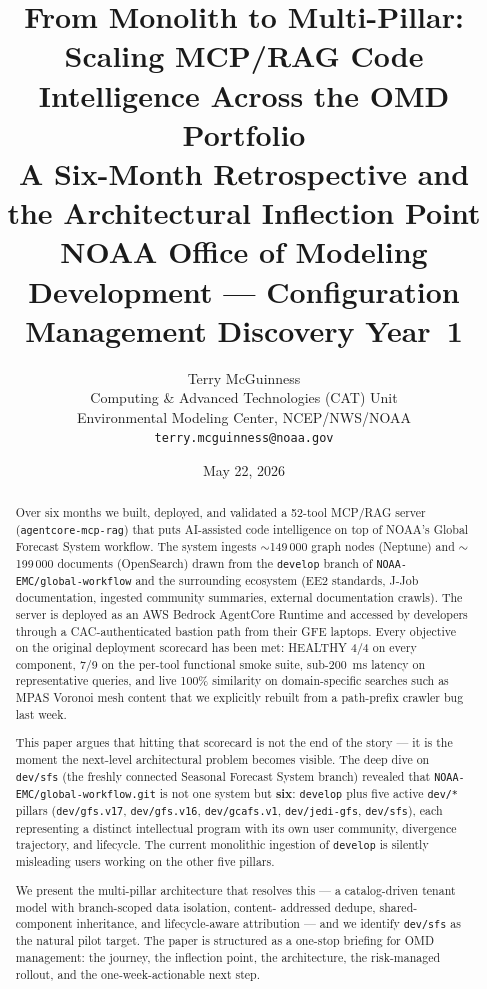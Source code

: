 \documentclass[11pt,letterpaper]{article}
\title{%
    \vspace{-1cm}
    \textcolor{noaablue}{\Large\textbf{From Monolith to Multi-Pillar:}}\\[0.2cm]
    \textcolor{noaablue}{\Large\textbf{Scaling MCP/RAG Code Intelligence Across the OMD Portfolio}}\\[0.3cm]
    \large A Six-Month Retrospective and the Architectural Inflection Point\\[0.2cm]
    \normalsize NOAA Office of Modeling Development --- Configuration Management Discovery Year~1
}
\author{%
    Terry McGuinness\\
    \small Computing \& Advanced Technologies (CAT) Unit\\
    \small Environmental Modeling Center, NCEP/NWS/NOAA\\
    \small \texttt{terry.mcguinness@noaa.gov}
}
\date{May 22, 2026}
\begin{document}
\maketitle
\thispagestyle{fancy}

\begin{abstract}
\noindent
Over six months we built, deployed, and validated a 52-tool MCP/RAG
server (\texttt{agentcore-mcp-rag}) that puts AI-assisted code
intelligence on top of NOAA's Global Forecast System workflow. The
system ingests $\sim$149\,000 graph nodes (Neptune) and $\sim$199\,000
documents (OpenSearch) drawn from the \texttt{develop} branch of
\texttt{NOAA-EMC/global-workflow} and the surrounding ecosystem
(EE2 standards, J-Job documentation, ingested community summaries,
external documentation crawls). The server is deployed as an AWS
Bedrock AgentCore Runtime and accessed by developers through a
CAC-authenticated bastion path from their GFE laptops. Every objective
on the original deployment scorecard has been met: HEALTHY 4/4 on every
component, 7/9 on the per-tool functional smoke suite, sub-200~ms
latency on representative queries, and live 100\% similarity on
domain-specific searches such as MPAS Voronoi mesh content that we
explicitly rebuilt from a path-prefix crawler bug last week.

This paper argues that hitting that scorecard is not the end of the
story --- it is the moment the next-level architectural problem
becomes visible. The deep dive on \texttt{dev/sfs} (the freshly
connected Seasonal Forecast System branch) revealed that
\texttt{NOAA-EMC/global-workflow.git} is not one system but
\textbf{six}: \texttt{develop} plus five active \texttt{dev/*} pillars
(\texttt{dev/gfs.v17}, \texttt{dev/gfs.v16}, \texttt{dev/gcafs.v1},
\texttt{dev/jedi-gfs}, \texttt{dev/sfs}), each representing a distinct
intellectual program with its own user community, divergence trajectory,
and lifecycle. The current monolithic ingestion of \texttt{develop} is
silently misleading users working on the other five pillars.

We present the multi-pillar architecture that resolves this --- a
catalog-driven tenant model with branch-scoped data isolation, content-
addressed dedupe, shared-component inheritance, and lifecycle-aware
attribution --- and we identify \texttt{dev/sfs} as the natural pilot
target. The paper is structured as a one-stop briefing for OMD
management: the journey, the inflection point, the architecture, the
risk-managed rollout, and the one-week-actionable next step.
\end{abstract}
\end{document}
